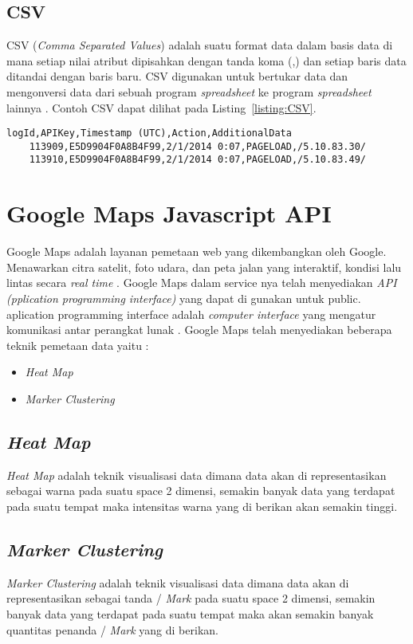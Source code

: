 \subsection{CSV}
\label{subsec:csv}
CSV (\textit{Comma Separated Values}) adalah suatu format data dalam basis data di mana setiap nilai atribut dipisahkan dengan tanda koma (,) dan setiap baris data ditandai dengan baris baru. CSV digunakan untuk bertukar data dan mengonversi data dari sebuah program \textit{spreadsheet} ke program \textit{spreadsheet} lainnya \cite{RFC4180}. Contoh CSV dapat dilihat pada Listing~\ref{listing:CSV}.

\begin{lstlisting}[caption=Contoh CSV, label=listing:CSV]
    logId,APIKey,Timestamp (UTC),Action,AdditionalData
    113909,E5D9904F0A8B4F99,2/1/2014 0:07,PAGELOAD,/5.10.83.30/
    113910,E5D9904F0A8B4F99,2/1/2014 0:07,PAGELOAD,/5.10.83.49/
\end{lstlisting}
	
\section{Google Maps Javascript API}
\label{sec:googlemaps}
Google Maps adalah layanan pemetaan web yang dikembangkan oleh Google. Menawarkan citra satelit, foto udara, dan peta jalan yang interaktif, kondisi lalu lintas secara \textit{real time} \cite{mehta:19:gmaps}.
Google Maps dalam service nya telah menyediakan \textit{API (pplication programming interface)} yang dapat di gunakan untuk public.
aplication programming interface adalah \textit{computer interface} yang mengatur komunikasi antar perangkat lunak \cite{libby:20:api}.
Google Maps telah menyediakan beberapa teknik pemetaan data yaitu :
 \begin{itemize}
     \item \textit{Heat Map}
     \item \textit{Marker Clustering}

 \end{itemize}
 \subsection{\textit{Heat Map}}
 \label{subsec:heat map}
 \textit{Heat Map } adalah teknik visualisasi data dimana data akan di representasikan sebagai warna pada suatu space 2 dimensi, semakin banyak data yang terdapat pada suatu tempat maka intensitas warna yang di berikan akan semakin tinggi.
 
 \subsection{\textit{Marker Clustering}}
 \label{subsec:heat map}
 \textit{Marker Clustering } adalah teknik visualisasi data dimana data akan di representasikan sebagai tanda / \textit{Mark} pada suatu space 2 dimensi, semakin banyak data yang terdapat pada suatu tempat maka akan semakin banyak quantitas penanda / \textit{Mark} yang di berikan.

 
